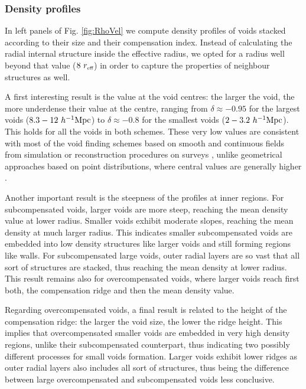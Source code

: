 \documentclass[a4,useAMS,usenatbib,usegraphicx]{latex/mn2e}
\begin{document}
\subsubsection{Density profiles}
\label{subsubsec:density_voids}


In left panels of Fig. \ref{fig:RhoVel} we compute density profiles of 
voids stacked according to their size and their compensation index. 
Instead of calculating the radial internal structure inside the effective
radius, we opted for a radius well beyond that value ($8\ \reff$) in order 
to capture the properties of neighbour structures as well. 


A first interesting result is the value at the void centres: the larger the 
void, the more underdense their value at the centre, ranging from $\delta
\approx-0.95$ for the largest voids ($8.3-12\ \hMpc$) to $\delta\approx 
-0.8$ for the smallest voids ($2-3.2\ \hMpc$). This holds for all the voids 
in both schemes. These very low values are consistent with most of the void 
finding schemes based on smooth and continuous fields from simulation or 
reconstruction procedures on surveys \citep{Plionis02, Colberg05, Shandarin06, 
Platen07, Neyrinck08, MunozCuartas11, Neyrinck13, Ricciardelli2013}, unlike
geometrical approaches based on point distributions, where central values
are generally higher \citep{Colberg08}.


Another important result is the steepness of the profiles at inner
regions. For subcompensated voids, larger voids are more steep, reaching
the mean density value at lower radius. Smaller voids exhibit moderate
slopes, reaching the mean density at much larger radius. This indicates 
smaller subcompensated voids are embedded into low density structures like 
larger voids and still forming regions like walls. For subcompensated large
voids, outer radial layers are so vast that all sort of structures are 
stacked, thus reaching the mean density at lower radius. This result 
remains also for overcompensated voids, where larger voids reach first 
both, the compensation ridge and then the mean density value.


Regarding overcompensated voids, a final result is related to the height 
of the compensation ridge: the larger the void size, the lower the ridge
height. This implies that overcompensated smaller voids are embedded in 
very high density regions, unlike their subcompensated counterpart, thus 
indicating two possibly different processes for small voids formation. 
Larger voids exhibit lower ridges as outer radial layers also includes all
sort of structures, thus being the difference between large overcompensated
and subcompensated voids less conclusive.
\end{document}
